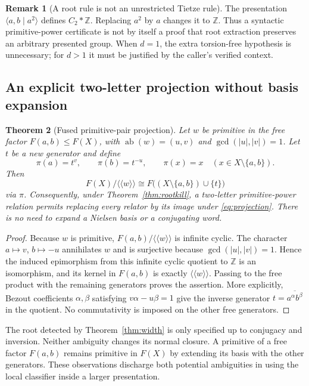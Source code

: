\documentclass[11pt,letterpaper]{article}
\newtheorem{theorem}{Theorem}[section]
\theoremstyle{definition}
\newtheorem{remark}[theorem]{Remark}
\newcommand{\Z}{\mathbb Z}
\newcommand{\nc}[1]{\langle\!\langle #1\rangle\!\rangle}
\newcommand{\ab}{\operatorname{ab}}
\begin{document}
\begin{remark}[A root rule is not an unrestricted Tietze rule]
The presentation $\langle a,b\mid a^2\rangle$ defines $C_2*\Z$.
Replacing $a^2$ by $a$ changes it to $\Z$. Thus a syntactic primitive-power
certificate is not by itself a proof that root extraction preserves an
arbitrary presented group. When $d=1$, the extra torsion-free hypothesis is
unnecessary; for $d>1$ it must be justified by the caller's verified context.
\end{remark}

\subsection{An explicit two-letter projection without basis expansion}
\begin{theorem}[Fused primitive-pair projection]
\label{thm:projection}
Let $w$ be primitive in the free factor $F(a,b)\leq F(X)$, with
$\ab(w)=(u,v)$ and $\gcd(|u|,|v|)=1$. Let $t$ be a new generator and define
\begin{equation}
 \pi(a)=t^v,\qquad \pi(b)=t^{-u},\qquad
 \pi(x)=x\quad(x\in X\setminus\{a,b\}).
 \label{eq:projection}
\end{equation}
Then
\[
 F(X)/\nc{w}\cong F\bigl((X\setminus\{a,b\})\cup\{t\}\bigr)
\]
via $\pi$. Consequently, under Theorem~\ref{thm:rootkill}, a two-letter
primitive-power relation permits replacing every relator by its image under
\eqref{eq:projection}. There is no need to expand a Nielsen basis or a
conjugating word.
\end{theorem}
\begin{proof}
Because $w$ is primitive, $F(a,b)/\nc{w}$ is infinite cyclic. The character
$a\mapsto v$, $b\mapsto-u$ annihilates $w$ and is surjective because
$\gcd(|u|,|v|)=1$. Hence the induced epimorphism from this infinite cyclic
quotient to $\Z$ is an isomorphism, and its kernel in $F(a,b)$ is exactly
$\nc{w}$. Passing to the free product with the remaining generators proves
the assertion. More explicitly, Bezout coefficients $\alpha,\beta$ satisfying
$v\alpha-u\beta=1$ give the inverse generator $t=\overline{a^\alpha b^\beta}$
in the quotient. No commutativity is imposed on the other free generators.
\end{proof}

The root detected by Theorem~\ref{thm:width} is only specified up to conjugacy
and inversion. Neither ambiguity changes its normal closure. A primitive
of a free factor $F(a,b)$ remains primitive in $F(X)$ by extending its basis
with the other generators. These observations discharge both potential
ambiguities in using the local classifier inside a larger presentation.
\end{document}
